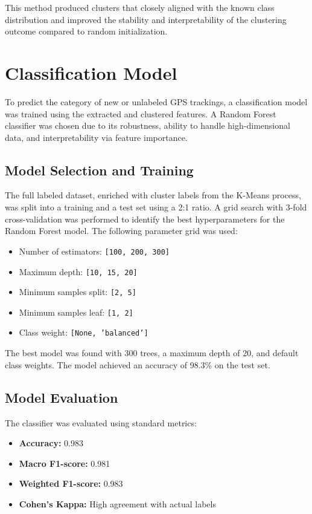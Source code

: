 \documentclass[a4paper,12pt,twoside]{scrreprt}
\begin{document}
This method produced clusters that closely aligned with the known class
distribution and improved the stability and interpretability of the clustering
outcome compared to random initialization.

\section{Classification Model}
To predict the category of new or unlabeled GPS trackings, a classification
model was trained using the extracted and clustered features. A Random Forest
classifier was chosen due to its robustness, ability to handle high-dimensional
data, and interpretability via feature importance.

\subsection{Model Selection and Training}

The full labeled dataset, enriched with cluster labels from the K-Means
process, was split into a training and a test set using a 2:1 ratio. A grid
search with 3-fold cross-validation was performed to identify the best
hyperparameters for the Random Forest model. The following parameter grid was
used:

\begin{itemize}
  \item Number of estimators: \texttt{[100, 200, 300]}
  \item Maximum depth: \texttt{[10, 15, 20]}
  \item Minimum samples split: \texttt{[2, 5]}
  \item Minimum samples leaf: \texttt{[1, 2]}
  \item Class weight: \texttt{[None, 'balanced']}
\end{itemize}

The best model was found with 300 trees, a maximum depth of 20, and default
class weights. The model achieved an accuracy of
98.3\% on the test set.

\subsection{Model Evaluation}

The classifier was evaluated using standard metrics:

\begin{itemize}
  \item \textbf{Accuracy:} 0.983
  \item \textbf{Macro F1-score:} 0.981
  \item \textbf{Weighted F1-score:} 0.983
  \item \textbf{Cohen's Kappa:} High agreement with actual labels
\end{itemize}
\end{document}
